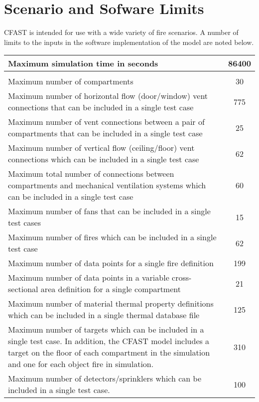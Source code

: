 \chapter{Scenario and Sofware Limits}

CFAST is intended for use with a wide variety of fire scenarios.  A number of limits to the inputs in the software implementation of the model are noted below. 


\begin{center}
\begin{tabular}{|p{15cm}|c|}
\hline
Maximum simulation time in seconds & 86400 \\ \hline

\\ \hline

Maximum number of compartments & 30 \\ \hline
Maximum number of horizontal flow (door/window) vent connections that can be included in a single test case & 775 \\ \hline
Maximum number of vent connections between a pair of compartments that can be included in a single test case & 25 \\ \hline
Maximum number of vertical flow (ceiling/floor) vent connections which can be included in a single test case & 62 \\ \hline
Maximum total number of connections between compartments and mechanical ventilation systems which can be included in a single test case & 60 \\ \hline
Maximum number of fans that can be included in a single test cases  & 15 \\ \hline

Maximum number of fires which can be included in a single test case & 62 \\ \hline
Maximum number of data points for a single  fire definition & 199 \\ \hline
Maximum number of data points in a variable cross-sectional area definition for a single compartment & 21 \\ \hline
Maximum number of material thermal property definitions which can be included in a single thermal database file & 125 \\ \hline

Maximum number of targets which can be included in a single test case. In addition, the CFAST model includes a target on the floor of each compartment in the simulation and one for each object fire in simulation. & 310 \\ \hline
Maximum number of detectors/sprinklers which can be included in a single test case. & 100 \\ \hline

\hline
\end{tabular}
\end{center}